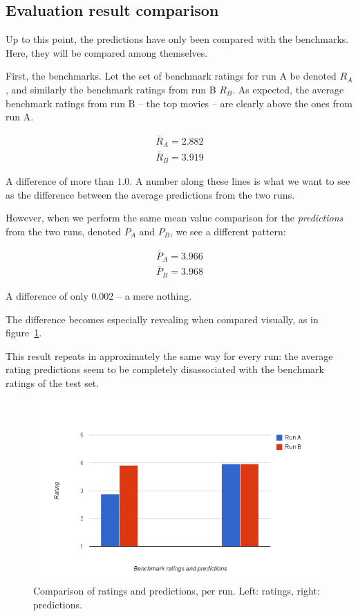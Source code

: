 \subsection{Evaluation result comparison} %
\label{sub:evaluation_result_comparison}

Up to this point, the predictions have only been compared with the benchmarks. Here, they will be compared among themselves.

First, the benchmarks. Let the set of benchmark ratings for run A be denoted $R_A$, and similarly the benchmark ratings from run B $R_B$. As expected, the average benchmark ratings from run B -- the top movies -- are clearly above the ones from run A.

\begin{align}
  \bar{R}_A = 2.882 \\
  \bar{R}_B = 3.919
\end{align}

A difference of more than $1.0$. A number along these lines is what we want to see as the difference between the average predictions from the two runs.

However, when we perform the same mean value comparison for the \emph{predictions} from the two runs, denoted $P_A$ and $P_B$, we see a different pattern:

\begin{align}
  \bar{P}_A = 3.966 \\
  \bar{P}_B = 3.968
\end{align}

A difference of only 0.002 -- a mere nothing.

The difference becomes especially revealing when compared visually, as in figure~\ref{fig:pr_run_comparison}.

This result repeats in approximately the same way for every run: the average rating predictions seem to be completely disassociated with the benchmark ratings of the test set.

\begin{figure}[h]
  \centering
    \includegraphics[width=.8\textwidth]{Figures/plots/pr_run_comparison}
  \caption{Comparison of ratings and predictions, per run. Left: ratings, right: predictions.}
  \label{fig:pr_run_comparison}
\end{figure}

